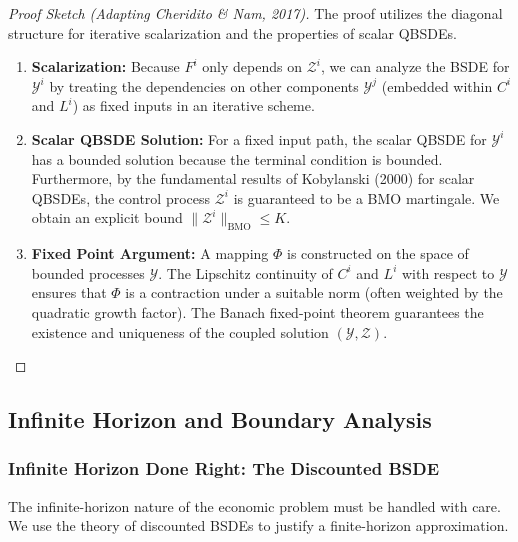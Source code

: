 \documentclass[11pt,letterpaper,oneside]{article}
\theoremstyle{plain}
\theoremstyle{definition}
\theoremstyle{remark}
\begin{document}
\begin{proof}[Proof Sketch (Adapting Cheridito \& Nam, 2017)]
The proof utilizes the diagonal structure for iterative scalarization and the properties of scalar QBSDEs.
\begin{enumerate}
    \item \textbf{Scalarization:} Because $F^i$ only depends on $\mathcal{Z}^i$, we can analyze the BSDE for $\mathcal{Y}^i$ by treating the dependencies on other components $\mathcal{Y}^j$ (embedded within $C^i$ and $L^i$) as fixed inputs in an iterative scheme.
    \item \textbf{Scalar QBSDE Solution:} For a fixed input path, the scalar QBSDE for $\mathcal{Y}^i$ has a bounded solution because the terminal condition is bounded. Furthermore, by the fundamental results of Kobylanski (2000) \cite{Kobylanski2000} for scalar QBSDEs, the control process $\mathcal{Z}^i$ is guaranteed to be a BMO martingale. We obtain an explicit bound $\|\mathcal{Z}^i\|_{\mathrm{BMO}} \le K$.
    \item \textbf{Fixed Point Argument:} A mapping $\Phi$ is constructed on the space of bounded processes $\mathcal{Y}$. The Lipschitz continuity of $C^i$ and $L^i$ with respect to $\mathcal{Y}$ ensures that $\Phi$ is a contraction under a suitable norm (often weighted by the quadratic growth factor). The Banach fixed-point theorem guarantees the existence and uniqueness of the coupled solution $(\mathcal{Y}, \mathcal{Z})$.
\end{enumerate}
\end{proof}

\subsection{Infinite Horizon and Boundary Analysis}
\label{subsec:GE_infinite_horizon}

\subsubsection{Infinite Horizon Done Right: The Discounted BSDE}
The infinite-horizon nature of the economic problem must be handled with care. We use the theory of discounted BSDEs to justify a finite-horizon approximation.
\end{document}
